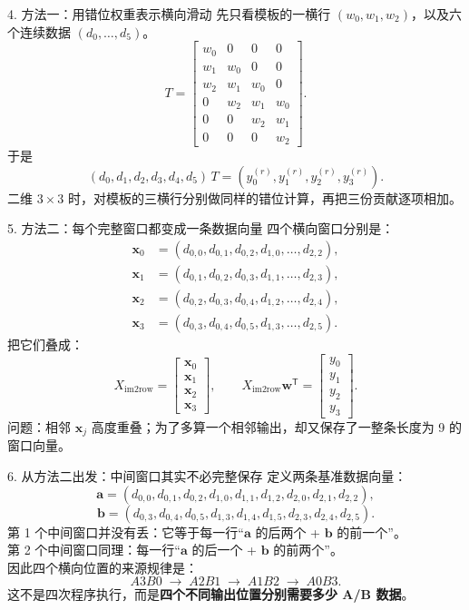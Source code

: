 \documentclass[aspectratio=169,11pt]{beamer}
\begin{document}
\begin{frame}{4. 方法一：用错位权重表示横向滑动}
\small
先只看模板的一横行 \((w_0,w_1,w_2)\)，以及六个连续数据 \((d_0,\ldots,d_5)\)。
\[
T=\begin{bmatrix}
 w_0&0&0&0\\
 w_1&w_0&0&0\\
 w_2&w_1&w_0&0\\
 0&w_2&w_1&w_0\\
 0&0&w_2&w_1\\
 0&0&0&w_2
\end{bmatrix}.
\]
于是
\[
(d_0,d_1,d_2,d_3,d_4,d_5)\,T
=(y_0^{(r)},y_1^{(r)},y_2^{(r)},y_3^{(r)}).
\]
二维 \(3\times3\) 时，对模板的三横行分别做同样的错位计算，再把三份贡献逐项相加。
\end{frame}

\begin{frame}{5. 方法二：每个完整窗口都变成一条数据向量}
\small
四个横向窗口分别是：
\[
\begin{aligned}
\bm x_0&=(d_{0,0},d_{0,1},d_{0,2},d_{1,0},\ldots,d_{2,2}),\\
\bm x_1&=(d_{0,1},d_{0,2},d_{0,3},d_{1,1},\ldots,d_{2,3}),\\
\bm x_2&=(d_{0,2},d_{0,3},d_{0,4},d_{1,2},\ldots,d_{2,4}),\\
\bm x_3&=(d_{0,3},d_{0,4},d_{0,5},d_{1,3},\ldots,d_{2,5}).
\end{aligned}
\]
把它们叠成：
\[
X_{\mathrm{im2row}}=\begin{bmatrix}\bm x_0\\\bm x_1\\\bm x_2\\\bm x_3\end{bmatrix},\qquad
X_{\mathrm{im2row}}\bm w^{\mathsf T}=\begin{bmatrix}y_0\\y_1\\y_2\\y_3\end{bmatrix}.
\]
问题：相邻 \(\bm x_j\) 高度重叠；为了多算一个相邻输出，却又保存了一整条长度为 9 的窗口向量。
\end{frame}

\begin{frame}{6. 从方法二出发：中间窗口其实不必完整保存}
\small
定义两条基准数据向量：
\[
\bm a=(d_{0,0},d_{0,1},d_{0,2},d_{1,0},d_{1,1},d_{1,2},d_{2,0},d_{2,1},d_{2,2}),
\]
\[
\bm b=(d_{0,3},d_{0,4},d_{0,5},d_{1,3},d_{1,4},d_{1,5},d_{2,3},d_{2,4},d_{2,5}).
\]
第 1 个中间窗口并没有丢：它等于每一行“\(\bm a\) 的后两个 + \(\bm b\) 的前一个”。\\[0.4em]
第 2 个中间窗口同理：每一行“\(\bm a\) 的后一个 + \(\bm b\) 的前两个”。\\[0.8em]
因此四个横向位置的来源规律是：
\[
A3B0\;\rightarrow\;A2B1\;\rightarrow\;A1B2\;\rightarrow\;A0B3.
\]
这不是四次程序执行，而是\textbf{四个不同输出位置分别需要多少 A/B 数据}。
\end{frame}
\end{document}
